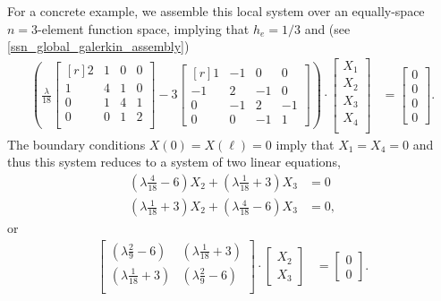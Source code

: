 For a concrete example, we assemble this local system over an equally-space $n=3$-element function space, implying that $h_e = 1/3$ and (see \cref{ssn_global_galerkin_assembly})
{\footnotesize
\begin{align*}
  \left( \frac{\lambda}{18} \begin{bmatrix}[r]
                              2 & 1 & 0 & 0 \\
                              1 & 4 & 1 & 0 \\
                              0 & 1 & 4 & 1 \\
                              0 & 0 & 1 & 2 \\
                            \end{bmatrix}
         - 3 \begin{bmatrix}[r]
                1 & -1 &  0 &  0 \\
               -1 &  2 & -1 &  0 \\
                0 & -1 &  2 & -1 \\
                0 &  0 & -1 &  1
             \end{bmatrix}
  \right) \cdot
  \begin{bmatrix}
    X_1 \\
    X_2 \\
    X_3 \\
    X_4 \\
  \end{bmatrix} &=
  \begin{bmatrix}
    0 \\
    0 \\
    0 \\
    0
  \end{bmatrix}.
\end{align*}}
The boundary conditions $X(0) = X(\ell) = 0$ imply that $X_1 = X_4 = 0$ and thus this system reduces to a system of two linear equations,
\begin{align*}
  \left( \lambda \frac{4}{18} - 6 \right) X_2 + \left( \lambda\frac{1}{18} + 3 \right) X_3 &= 0 \\
  \left( \lambda \frac{1}{18} + 3 \right) X_2 + \left( \lambda\frac{4}{18} - 6 \right) X_3 &= 0,
\end{align*}
or
\begin{align*}
  \begin{bmatrix}
    \left( \lambda \frac{2}{9} - 6 \right) & \left( \lambda \frac{1}{18} + 3 \right) \\
    \left( \lambda \frac{1}{18} + 3 \right) & \left( \lambda \frac{2}{9} - 6 \right) \\
  \end{bmatrix} \cdot
  \begin{bmatrix}
    X_2 \\
    X_3 
  \end{bmatrix} &=
  \begin{bmatrix}
    0 \\
    0
  \end{bmatrix}.
\end{align*}
